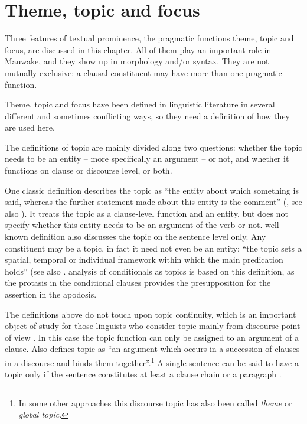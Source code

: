 
\chapter{Theme, topic and focus}

Three features of textual prominence, the pragmatic functions theme, topic and focus, are discussed in this chapter. All of them play an important role in Mauwake, and they show up in morphology and/or syntax. They are not mutually exclusive: a clausal constituent may have more than one pragmatic function. 

Theme, topic and focus have been defined in linguistic literature in several different and sometimes conflicting ways, so they need a definition of how they are used here. 

The definitions of topic are mainly divided along two questions: whether the topic needs to be an entity -- more specifically an argument -- or not, and whether it functions on clause or discourse level, or both. 

One classic definition describes the topic as ``the entity about which something is said, whereas the further statement made about this entity is the comment'' (\citealt{Crystal1997}, see also \citealt[19]{Dik1978}). It treats the topic as a clause-level function and an entity, but does not specify whether this entity needs to be an argument of the verb or not.   well-known definition also discusses the topic on the sentence level only. Any constituent may be a topic, in fact it need not even be an entity: ``the topic sets a spatial, temporal or individual framework within which the main predication holds'' (see also \citealt[461]{LiEtAt1976}.  analysis of conditionals as topics is based on this definition, as the protasis in the conditional clauses provides the presupposition for the assertion in the apodosis.

The definitions above do not touch upon topic continuity, which is an important  object of study for those linguists who consider topic mainly from discourse point of view \citep{Givon1976, Givon1983a, Givon1990}.  In this case the topic function can only be assigned to an argument of a clause. Also \citet[340]{Dixon2010a} defines topic as ``an argument which occurs in a succession of clauses in a discourse and binds them together''.\footnote{In some other approaches this discourse topic has also been called \textit{theme} or \textit{global topic}.} A single sentence can be said to have a topic only if the sentence constitutes at least a clause chain or a paragraph \citep[902]{Givon1990}. 

